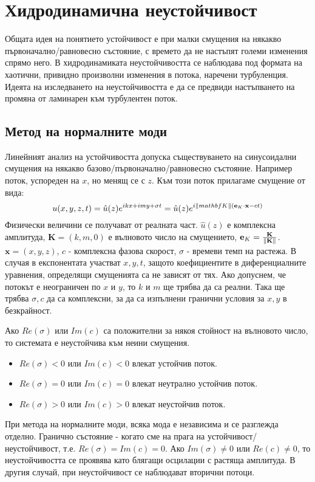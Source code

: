 \setcounter{equation}{0}
\section{Хидродинамична неустойчивост}
Общата идея на понятието устойчивост е при малки смущения на някакво първоначално/равновесно състояние, с времето да не настъпят големи изменения спрямо него.
В хидродинамиката неустойчивостта се наблюдава под формата на хаотични, привидно произволни изменения в потока, наречени турбуленция.
Идеята на изследването на неустойчивостта е да се предвиди настъпването на промяна от ламинарен към турбулентен поток. 


\subsection{Метод на нормалните моди}
Линейният анализ на устойчивостта допуска съществуването на синусоидални смущения на някакво базово/първоначално/равновесно състояние.
Например поток, успореден на $x$, но менящ се с $z$. Към този поток прилагаме смущение от вида:
\begin{equation}
	u(x, y, z, t) = \hat{u}(z) e^{ikx + imy + \sigma t} = \hat{u}(z) e^{i \norm{mathbf{K}}(\mathbf{e}_K \cdot \mathbf{x} - ct)}
\end{equation}
Физически величини се получават от реалната част.
$\hat{u}(z)$ е комплексна амплитуда, $\mathbf{K} = (k, m, 0)$ е вълновото число на смущението, $\mathbf{e}_K=\frac{\mathbf{K}}{\norm{\mathbf{K}}}$.
$\mathbf{x} = (x, y, z)$, $c$ - комплексна фазова скорост, $\sigma$ - времеви темп на растежа.
В случая в експонентата участват $x, y, t$, защото коефициентите в диференциалните уравнения, определящи смущенията са не зависят от тях. 
Ако допуснем, че потокът е неограничен по $x$ и $y$, то $k$ и $m$ ще трябва да са реални. 
Така ще трябва $\sigma, c$ да са комплексни, за да са изпълнени гранични условия за $x, y$ в безкрайност.

Ако $Re(\sigma)$ или $Im(c)$ са положителни за някоя стойност на вълновото число, то системата е неустойчива към неини смущения.
\begin{itemize}
	\item $Re(\sigma) < 0$ или $Im(c) < 0$ влекат устойчив поток.
	\item $Re(\sigma) = 0$ или $Im(c) = 0$ влекат неутрално устойчив поток.
	\item $Re(\sigma) > 0$ или $Im(c) > 0$ влекат неустойчив поток.
\end{itemize}
При метода на нормалните моди, всяка мода е независима и се разглежда отделно.
Гранично състояние - когато сме на прага на устойчивост/неустойчивост, т.е. $Re(\sigma) = Im(c) = 0$.
Ако $Im(\sigma) \neq 0$ или $Re(c) \neq 0$, то неустойчивостта се проявява като блягащи осцилации с растяща амплитуда.
В другия случай, при неустойчивост се наблюдават вторични потоци.


